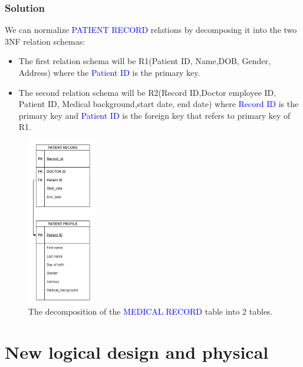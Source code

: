 \documentclass[a4paper]{article}
\numberwithin{equation}{section}
\begin{document}
\subsubsection{Solution}
We can normalize \textcolor{blue}{PATIENT RECORD} relations by decomposing it into the two 3NF relation schemas:
\begin{itemize}
  \item The first relation schema will be R1(Patient ID, Name,DOB, Gender, Address) where the \textcolor{blue}{Patient ID} is the primary key.
  \item The second relation schema will be R2(Record ID,Doctor employee ID, Patient ID, Medical background,start date, end date) where \textcolor{blue}{Record ID} is the primary key and \textcolor{blue}{Patient ID} is the foreign key that refers to primary key of R1.
\end{itemize}

\pagebreak

\begin{figure}[H]
  \centering
  \includegraphics[width = 3cm ]{assets/3NFsolution.PNG}
  \captionsetup{justification=centering,margin=2cm}
  \caption{The decomposition of the \textcolor{blue}{MEDICAL RECORD} table into 2 tables.}
\end{figure}

\section{New logical design and physical}
\end{document}
